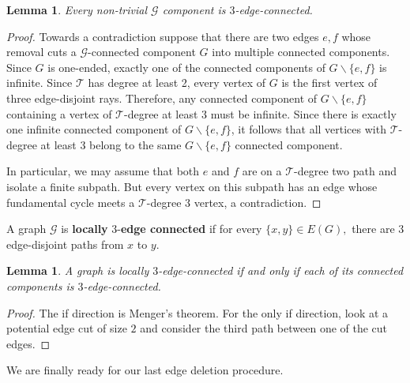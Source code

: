 \documentclass[letterpaper,11pt,reqno]{amsart}
\theoremstyle{bfnote}
\newtheorem{lemma}[theorem]{Lemma}
\theoremstyle{definition}
\newcommand{\0}{\varnothing}
\numberwithin{equation}{section}
\begin{document}
\begin{lemma}\label{3con}
    Every non-trivial $\mathcal{G}$ component is $3$-edge-connected.
\end{lemma}
\begin{proof}
    Towards a contradiction suppose that there are two edges $e,f$ whose removal cuts a $\mathcal{G}$-connected component $G$ into multiple connected components. Since $G$ is one-ended, exactly one of the connected components of $G \backslash \{e,f\}$ is infinite.  Since $\mathcal{T}$ has degree at least 2, every vertex of $G$ is the first vertex of three edge-disjoint rays. Therefore, any connected component of $G \backslash \{e,f\}$ containing a vertex of $\mathcal{T}$-degree at least 3 must be infinite. Since there is exactly one infinite connected component of $G \backslash \{e,f\}$, it follows that all vertices with $\mathcal{T}$-degree at least 3 belong to the same $G \backslash \{e,f\}$ connected component. 
    
    In particular, we may assume that both $e$ and $f$ are on a $\mathcal{T}$-degree two path and isolate a finite subpath.  But every vertex on this subpath has an edge whose fundamental cycle meets a $\mathcal{T}$-degree $3$ vertex, a contradiction.
\end{proof}

A graph $\mathcal{G}$ is \textbf{locally} $3$-\textbf{edge connected} if for every $\{x,y\}\in E(G),$ there are $3$ edge-disjoint paths from $x$ to $y.$ 
\begin{lemma}\label{Menger}
    A graph is locally $3$-edge-connected if and only if each of its connected components is $3$-edge-connected.
\end{lemma}

\begin{proof}
    The if direction is Menger's theorem.  For the only if direction, look at a potential edge cut of size $2$ and consider the third path between one of the cut edges.
\end{proof}

We are finally ready for our last edge deletion procedure.
\end{document}
